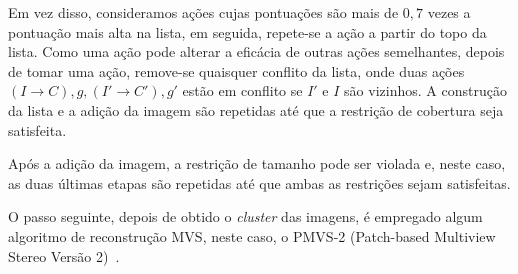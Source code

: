 \begin{itemize}

Em vez disso, consideramos ações cujas pontuações são mais de $0,7$ vezes a pontuação mais alta na lista, em seguida, repete-se a ação a partir do topo da lista. Como uma ação pode alterar a eficácia de outras ações semelhantes, depois de tomar uma ação, remove-se quaisquer conflito da lista, onde duas ações ${(I \rightarrow C), g}, {(I' \rightarrow C'), g' }$ estão em conflito se $I'$ e $I$ são vizinhos. A construção da lista e a adição da imagem são repetidas até que a restrição de cobertura seja satisfeita.

Após a adição da imagem, a restrição de tamanho pode ser violada e, neste caso, as duas últimas etapas são repetidas até que ambas as restrições sejam satisfeitas.

O passo seguinte, depois de obtido o \emph{cluster} das imagens, é empregado algum algoritmo de reconstrução MVS, neste caso, o PMVS-2 (Patch-based Multiview Stereo Versão 2)~\cite{visualSfMPMVS,Li2013,furukawa2010towards}.


\end{itemize}
